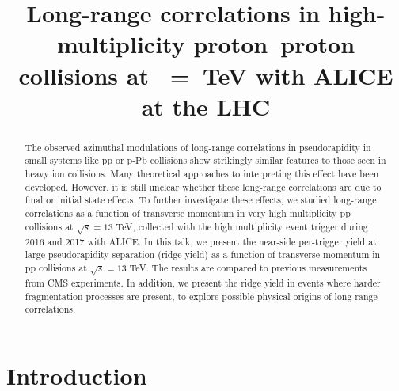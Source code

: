 \documentclass[ALICE,manyauthors]{cernphprep}
\begin{document}
\begin{titlepage}

\PHyear{}
\PHdate{\today}
%

\title{Long-range correlations  in high-multiplicity  proton--proton collisions  at \s~=~\unit[13]{TeV} with ALICE at the LHC}


\begin{abstract}

The observed azimuthal modulations of long-range correlations in pseudorapidity in small systems like pp or p-Pb collisions show strikingly similar features to those seen in heavy ion collisions. Many theoretical approaches to interpreting this effect have been developed. However, it is still unclear whether these long-range correlations are due to final or initial state effects. To further investigate these effects, we studied long-range correlations as a function of transverse momentum in very high multiplicity pp collisions at $\sqrt{s} =13$ TeV, collected with the high multiplicity event trigger during 2016 and 2017 with ALICE. In this talk, we present the near-side per-trigger yield at large pseudorapidity separation (ridge yield) as a function of transverse momentum in pp collisions at $\sqrt{s} =13$ TeV. The results are compared to previous measurements from CMS experiments. In addition, we present the ridge yield in events where harder fragmentation processes are present, to explore possible physical origins of long-range correlations.

\end{abstract}
\end{titlepage}
\setcounter{page}{2}



\section{Introduction}
\end{document}
